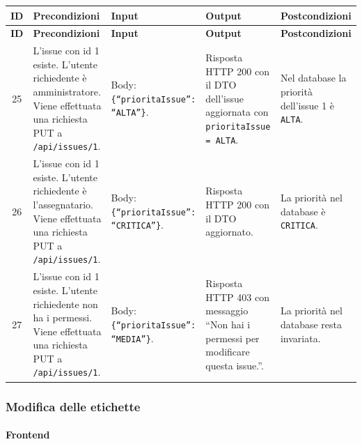 {
\small
\begin{longtable}{|c|p{3.8cm}|p{3.8cm}|p{3.8cm}|p{3.8cm}|}
\hline
\textbf{ID} & \textbf{Precondizioni} & \textbf{Input} & \textbf{Output} & \textbf{Postcondizioni} \\
\hline
\endfirsthead
\hline
\textbf{ID} & \textbf{Precondizioni} & \textbf{Input} & \textbf{Output} & \textbf{Postcondizioni} \\
\hline
\endhead
25 &
L'issue con id 1 esiste. L'utente richiedente \`e amministratore. Viene effettuata una richiesta PUT a \texttt{/api/issues/1}. &
Body: \texttt{\{``prioritaIssue'': ``ALTA''\}}. &
Risposta HTTP 200 con il DTO dell'issue aggiornata con \texttt{prioritaIssue = ALTA}. &
Nel database la priorit\`a dell'issue 1 \`e \texttt{ALTA}. \\
\hline
26 &
L'issue con id 1 esiste. L'utente richiedente \`e l'assegnatario. Viene effettuata una richiesta PUT a \texttt{/api/issues/1}. &
Body: \texttt{\{``prioritaIssue'': ``CRITICA''\}}. &
Risposta HTTP 200 con il DTO aggiornato. &
La priorit\`a nel database \`e \texttt{CRITICA}. \\
\hline
27 &
L'issue con id 1 esiste. L'utente richiedente non ha i permessi. Viene effettuata una richiesta PUT a \texttt{/api/issues/1}. &
Body: \texttt{\{``prioritaIssue'': ``MEDIA''\}}. &
Risposta HTTP 403 con messaggio ``Non hai i permessi per modificare questa issue.''. &
La priorit\`a nel database resta invariata. \\
\hline
\end{longtable}
}

\subsubsection{Modifica delle etichette}

\paragraph{Frontend}

